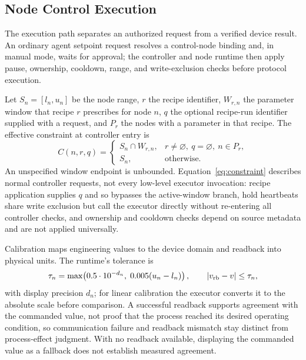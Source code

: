 \subsection{Node Control Execution}
\label{sec:writepath}
The execution path separates an authorized request from a verified device result.
An ordinary agent setpoint request resolves a control-node binding and, in manual
mode, waits for approval; the controller and node runtime then apply pause,
ownership, cooldown, range, and write-exclusion checks before protocol execution.

Let $S_n=[l_n,u_n]$ be the node range, $r$ the recipe identifier, $W_{r,n}$ the
parameter window that recipe $r$ prescribes for node $n$, $q$ the optional
recipe-run identifier supplied with a request, and $P_r$ the nodes with a
parameter in that recipe. The effective constraint at controller entry is
\begin{equation}
C(n,r,q)=
\begin{cases}
S_n\cap W_{r,n}, & r\neq\varnothing,\ q=\varnothing,\ n\in P_r,\\
S_n, & \text{otherwise}.
\end{cases}
\label{eq:constraint}
\end{equation}
An unspecified window endpoint is unbounded. Equation~\eqref{eq:constraint}
describes normal controller requests, not every low-level executor invocation:
recipe application supplies $q$ and so bypasses the active-window branch, hold
heartbeats share write exclusion but call the executor directly without
re-entering all controller checks, and ownership and cooldown checks depend on
source metadata and are not applied universally.

Calibration maps engineering values to the device domain and readback into
physical units. The runtime's tolerance is
\begin{equation}
\tau_n=\max\!\left(0.5\cdot 10^{-d_n},\;0.005(u_n-l_n)\right),
\qquad |v_{\rm rb}-v|\leq\tau_n,
\label{eq:tolerance}
\end{equation}
with display precision $d_n$; for linear calibration the executor converts it to
the absolute scale before comparison. A successful readback supports agreement
with the commanded value, not proof that the process reached its desired operating
condition, so communication failure and readback mismatch stay distinct from
process-effect judgment. With no readback available, displaying the commanded value
as a fallback does not establish measured agreement.

